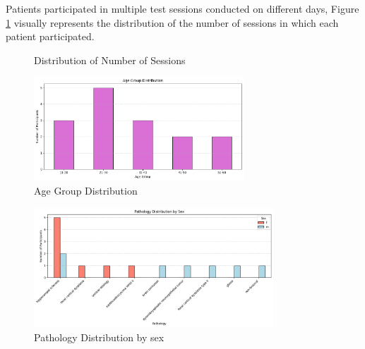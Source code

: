 \documentclass{article}
\begin{document}
Patients participated in multiple test sessions conducted on different days, Figure \ref{fig:session_distribution} visually represents the distribution of the number of sessions in which each patient participated.

\begin{figure}[ht]
  \centering
  \caption{Distribution of Number of Sessions}
  \label{fig:session_distribution}
\end{figure}


\begin{figure}[h]
  \centering
  \includegraphics[width=0.7\textwidth]{img/Age_Group_Distribution.png}
  \caption{Age Group Distribution}
  \label{fig:Age}
\end{figure}

\begin{figure}[h]
  \centering
  \includegraphics[width=0.8\textwidth]{img/pathology_dist_sex.png}
  \caption{Pathology Distribution by sex}
  \label{fig:sex}
\end{figure}
\end{document}
